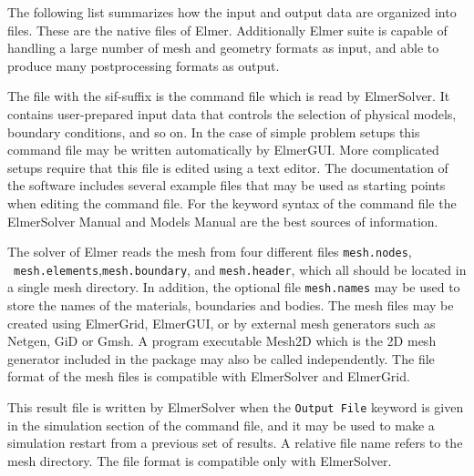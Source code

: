 The following list summarizes how the input and output data are organized into files.
These are the native files of Elmer. Additionally Elmer suite is capable of handling a large 
number of mesh and geometry formats as input, and able to produce many postprocessing formats
as output.


\sifbegin
{}
The file with the sif-suffix is the command file which is read by ElmerSolver.
It contains user-prepared input data that controls the selection of physical models,
boundary conditions, and so on. In the case of simple problem setups this command file 
may be written automatically by ElmerGUI. More complicated setups require that this 
file is edited using a text editor. The documentation of the software includes several
example files that may be used as starting points when editing the command file.
For the keyword syntax of the command file
the ElmerSolver Manual and Models Manual are the best sources of information.

The solver of Elmer reads the mesh from four different files \texttt{mesh.nodes},
~\texttt{mesh.elements},\linebreak[4] \texttt{mesh.boundary}, and \texttt{mesh.header},
which all should be located in a single mesh directory. In addition, the optional file
\texttt{mesh.names} may be used to store the names of the materials, boundaries and bodies.
The mesh files may be created using 
ElmerGrid, ElmerGUI, or by external mesh generators such as Netgen, GiD or Gmsh. A program executable
Mesh2D which is the 2D mesh generator included in the package may also be called independently.
The file format of the mesh files is compatible with ElmerSolver and ElmerGrid.

This result file is written by ElmerSolver when the \texttt{Output File} keyword is given in the
simulation section of the command file, and it may be used to make a simulation 
restart from a previous set of results. A relative file name refers to 
the mesh directory. The file format is compatible only with ElmerSolver.

